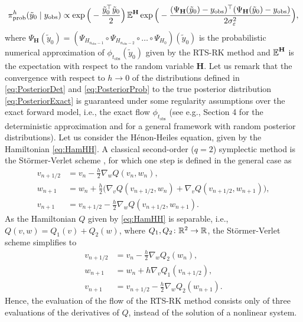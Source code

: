 \documentclass[10pt]{article}
\begin{document}
\begin{equation}\label{eq:PosteriorProb}
	\pi^h_{\mathrm{prob}}(\tilde y_0 \mid y_{\mathrm{obs}}) \propto \exp\Big(-\frac{\tilde y_0^\top \tilde y_0}{2}\Big) \operatorname{\mathbb{E}}^{\mathbf{H}} \exp\Big(-\frac{(\Psi_\mathbf{H}(\tilde y_0) - y_{\mathrm{obs}})^\top(\Psi_\mathbf{H}(\tilde y_0) - y_{\mathrm{obs}})}{2\sigma_\varepsilon^2}\Big),
\end{equation}
where $\Psi_\mathbf H(\tilde y_0) = (\Psi_{H_{n_{\mathrm{obs}}-1}} \circ \Psi_{H_{n_{\mathrm{obs}}-2}} \circ \ldots \circ \Psi_{H_0})(\tilde y_0)$ is the probabilistic numerical approximation of $\phi_{t_{\mathrm{obs}}}(\tilde y_0)$ given by the RTS-RK method and $\operatorname{\mathbb{E}}^\mathbf{H}$ is the expectation with respect to the random variable $\mathbf{H}$. Let us remark that the convergence with respect to $h \to 0$ of the distributions defined in \eqref{eq:PosteriorDet} and \eqref{eq:PosteriorProb} to the true posterior distribution \eqref{eq:PosteriorExact} is guaranteed under some regularity assumptions over the exact forward model, i.e., the exact flow $\phi_{t_{\mathrm{obs}}}$ (see e.g., \cite{Stu10} Section 4 for the deterministic approximation and \cite{LST17} for a general framework with random posterior distributions).
Let us consider the Hénon-Heiles equation, given by the Hamiltonian \eqref{eq:HamHH}. A classical second-order ($q = 2$) symplectic method is the Störmer-Verlet scheme \cite{Sto07, Ver67, HLW06}, for which one step is defined in the general case as
\begin{equation}
\begin{aligned}
	v_{n+1/2} &= v_n - \frac{h}{2} \nabla_w Q(v_n, w_n), \\
	w_{n+1} &= w_n + \frac{h}{2} \big(\nabla_v Q(v_{n+1/2}, w_n) + \nabla_v Q(v_{n+1/2}, w_{n+1})\big),\\
	v_{n+1} &= v_{n+1/2} - \frac{h}{2} \nabla_w Q(v_{n+1/2}, w_{n+1}).
\end{aligned}
\end{equation}
As the Hamiltonian $Q$ given by \eqref{eq:HamHH} is separable, i.e., $Q(v, w) = Q_1(v) + Q_2(w)$, where $Q_1, Q_2 \colon \mathbb{R}^2 \to \mathbb{R}$, the Störmer-Verlet scheme simplifies to
\begin{equation}
\begin{aligned}
	v_{n+1/2} &= v_n - \frac{h}{2} \nabla_w Q_2(w_n), \\
	w_{n+1} &= w_n + h \nabla_v Q_1(v_{n+1/2}),\\
	v_{n+1} &= v_{n+1/2} - \frac{h}{2} \nabla_w Q_2(w_{n+1}).
\end{aligned}
\end{equation}
Hence, the evaluation of the flow of the RTS-RK method consists only of three evaluations of the derivatives of $Q$, instead of the solution of a nonlinear system. 
\end{document}
